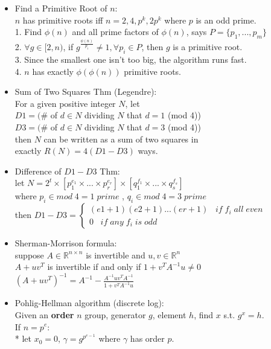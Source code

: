 \begin{itemize}[leftmargin=*]
\item Find a Primitive Root of $n$:\\
  $n$ has primitive roots iff $n=2,4,p^k,2p^k$ where $p$ is an odd prime.\\
  1. Find $\phi(n)$ and all prime factors of $\phi(n)$, says $P=\{p_1,...,p_m\}$\\
  2. $\forall g\in[2,n)$, if $g^{\frac{\phi(n)}{p_i}}\ne 1,\forall p_i\in P$, then $g$ is a primitive root.\\
  3. Since the smallest one isn't too big, the algorithm runs fast.\\
  4. $n$ has exactly $\phi(\phi(n))$ primitive roots.
\item Sum of Two Squares Thm (Legendre):\\
  For a given positive integer $N$, let\\
  $D1 = (\#$ of $d \in N$ dividing $N$ that $d=1$ (mod 4))\\
  $D3 = (\#$ of $d \in N$ dividing $N$ that $d=3$ (mod 4))\\
  then $N$ can be written as a sum of two squares in\\
  exactly $R(N) = 4(D1-D3)$ ways.
\item Difference of $D1-D3$ Thm:\\
  let $N=2^t \times [p_1^{e_1} \times ...\times p_r^{e_r}] \times [q_1^{f_1} \times ...\times q_s^{f_s}]$\\
  where $p_i \in mod\;4 = 1\;prime$ , $q_i \in mod\;4 = 3\;prime$\\
  then $D1 - D3 = \begin{cases}(e1+1)(e2+1)...(er+1)\;\;\;if\;f_i\;all\;even\\0\;\;\;if\;any\;f_i\;is\;odd\end{cases}$
\item Sherman-Morrison formula:\\
  suppose $A \in \mathbb{R}^{n\times n}$ is invertible and $u,v \in \mathbb{R}^n$\\
  $A + uv^T$ is invertible if and only if $1 + v^TA^{-1}u \ne 0$\\
  $(A + uv^T)^{-1} = A^{-1} - \frac{A^{-1}uv^TA^{-1}}{1+v^TA^{-1}u}$\\
\item Pohlig-Hellman algorithm (discrete log):\\
  Given an \textbf{order} $n$ group, generator $g$, element $h$, find $x$ s.t. $g^x=h$.\\
  If $n=p^e$:\\
    * let $x_0=0$, $\gamma=g^{p^{e-1}}$ where $\gamma$ has order $p$.\\

\end{itemize}
